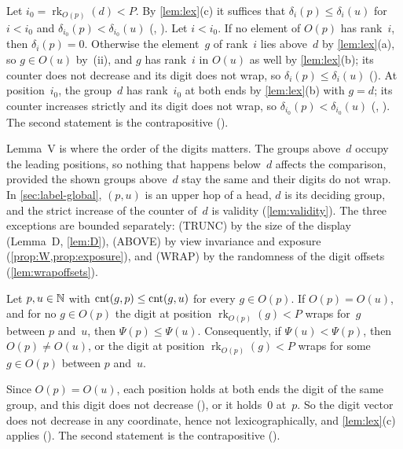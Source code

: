 \begin{outline}
Let $i_0=\operatorname{rk}_{O(p)}(d)<P$. By \cref{lem:lex}(c) it suffices that $\delta_i(p)\le\delta_i(u)$ for $i<i_0$ and
$\delta_{i_0}(p)<\delta_{i_0}(u)$ (, ). Let $i<i_0$. If no element of $O(p)$ has
rank~$i$, then $\delta_i(p)=0$. Otherwise the element~$g$ of rank~$i$ lies above~$d$ by \cref{lem:lex}(a), so $g\in O(u)$ by~(ii),
and $g$ has rank~$i$ in $O(u)$ as well by \cref{lem:lex}(b); its counter does not decrease and its digit does not wrap, so
$\delta_i(p)\le\delta_i(u)$ (). At position~$i_0$, the group~$d$ has rank~$i_0$ at both ends
by \cref{lem:lex}(b) with $g=d$; its counter increases strictly and its digit does not wrap, so $\delta_{i_0}(p)<\delta_{i_0}(u)$
(, ). The second statement is the contrapositive
().
\end{outline}

Lemma~V is where the order of the digits matters. The groups above~$d$ occupy the leading positions, so nothing that happens
below~$d$ affects the comparison, provided the shown groups above~$d$ stay the same and their digits do not wrap. In
\cref{sec:label-global}, $(p,u)$ is an upper hop of a head, $d$ is its deciding group, and the strict increase of the counter
of~$d$ is validity (\cref{lem:validity}). The three exceptions are bounded separately: (TRUNC) by the size of the display
(Lemma~D, \cref{lem:D}), (ABOVE) by view invariance and exposure (\cref{prop:W,prop:exposure}), and (WRAP) by the randomness of the
digit offsets (\cref{lem:wrapoffsets}).

\begin{lemma}\label{lem:stateedge}
Let $p,u\in\mathbb{N}$ with $\mathrm{cnt}(g,p)\le\mathrm{cnt}(g,u)$ for every $g\in O(p)$. If $O(p)=O(u)$, and for no $g\in O(p)$ the digit at position
$\operatorname{rk}_{O(p)}(g)<P$ wraps for~$g$ between $p$ and~$u$, then $\Psi(p)\le\Psi(u)$. Consequently, if $\Psi(u)<\Psi(p)$,
then $O(p)\ne O(u)$, or the digit at position $\operatorname{rk}_{O(p)}(g)<P$ wraps for some $g\in O(p)$ between $p$ and~$u$.
\end{lemma}

\begin{outline}
Since $O(p)=O(u)$, each position holds at both ends the digit of the same group, and this digit does not decrease
(), or it holds~$0$ at~$p$. So the digit vector does not decrease in any coordinate, hence
not lexicographically, and \cref{lem:lex}(c) applies (). The second statement is the contrapositive
().
\end{outline}

